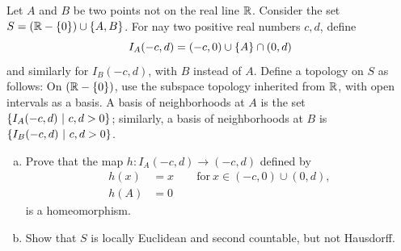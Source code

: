 \begin{problem}
	Let $ A $ and $ B $ be two points not on the real line $ \mathbb{R} $. Consider the set $ S = (\mathbb{R} - \{0\}) \cup \{A,B\} $. For nay two positive real numbers $ c,d $, define 
	\[ I_A(-c,d) = (-c,0) \cup \{A\} \cap (0,d) \]
	and similarly for $ I_B(-c,d) $, with $ B $ instead of $ A $. Define a topology on $ S $ as follows: On $ (\mathbb{R} - \{0\}) $, use the subspace topology inherited from $ \mathbb{R} $, with open intervals as a basis. A basis of neighborhoods at $ A $ is the set $ \{I_A(-c,d)\ |\ c,d > 0\} $; similarly, a basis of neighborhoods at $ B $ is $ \{I_B(-c,d)\ |\ c,d > 0\} $.
	\begin{enumerate}[(a)]
		\item Prove that the map $ h: I_A(-c,d) \to (-c,d) $ defined by
		\begin{align*}
			h(x)&=x \qquad \text{for}\ x\in(-c,0) \cup (0,d),\\
			h(A)&=0
		\end{align*}
		is a homeomorphism.
		
		\item Show that $ S $ is locally Euclidean and second countable, but not Hausdorff.
	\end{enumerate}
\end{problem}

